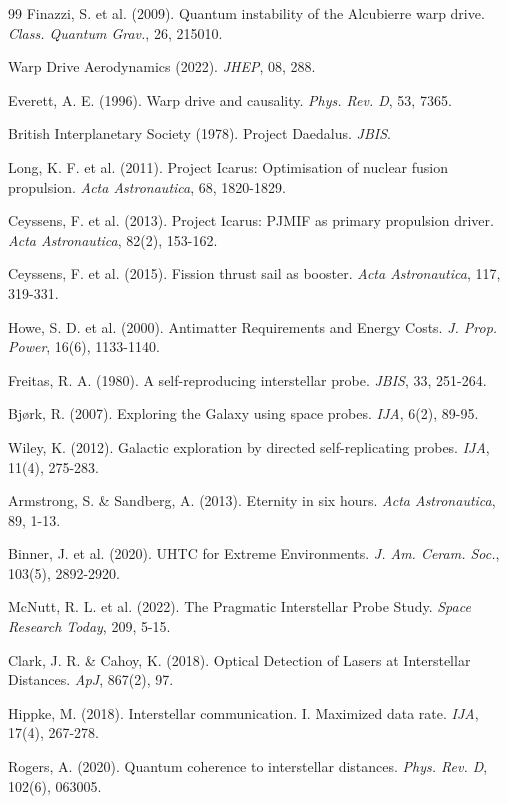 \documentclass[11pt,a4paper,onecolumn]{article}
\begin{document}
\begin{thebibliography}{99}
 Finazzi, S. et al. (2009). Quantum instability of the Alcubierre warp drive. \textit{Class. Quantum Grav.}, 26, 215010.

 Warp Drive Aerodynamics (2022). \textit{JHEP}, 08, 288.

 Everett, A. E. (1996). Warp drive and causality. \textit{Phys. Rev. D}, 53, 7365.

 British Interplanetary Society (1978). Project Daedalus. \textit{JBIS}.

 Long, K. F. et al. (2011). Project Icarus: Optimisation of nuclear fusion propulsion. \textit{Acta Astronautica}, 68, 1820-1829.

 Ceyssens, F. et al. (2013). Project Icarus: PJMIF as primary propulsion driver. \textit{Acta Astronautica}, 82(2), 153-162.

 Ceyssens, F. et al. (2015). Fission thrust sail as booster. \textit{Acta Astronautica}, 117, 319-331.

 Howe, S. D. et al. (2000). Antimatter Requirements and Energy Costs. \textit{J. Prop. Power}, 16(6), 1133-1140.

 Freitas, R. A. (1980). A self-reproducing interstellar probe. \textit{JBIS}, 33, 251-264.

 Bjørk, R. (2007). Exploring the Galaxy using space probes. \textit{IJA}, 6(2), 89-95.

 Wiley, K. (2012). Galactic exploration by directed self-replicating probes. \textit{IJA}, 11(4), 275-283.

 Armstrong, S. \& Sandberg, A. (2013). Eternity in six hours. \textit{Acta Astronautica}, 89, 1-13.

 Binner, J. et al. (2020). UHTC for Extreme Environments. \textit{J. Am. Ceram. Soc.}, 103(5), 2892-2920.

 McNutt, R. L. et al. (2022). The Pragmatic Interstellar Probe Study. \textit{Space Research Today}, 209, 5-15.

 Clark, J. R. \& Cahoy, K. (2018). Optical Detection of Lasers at Interstellar Distances. \textit{ApJ}, 867(2), 97.

 Hippke, M. (2018). Interstellar communication. I. Maximized data rate. \textit{IJA}, 17(4), 267-278.

 Rogers, A. (2020). Quantum coherence to interstellar distances. \textit{Phys. Rev. D}, 102(6), 063005.


\end{thebibliography}
\end{document}
